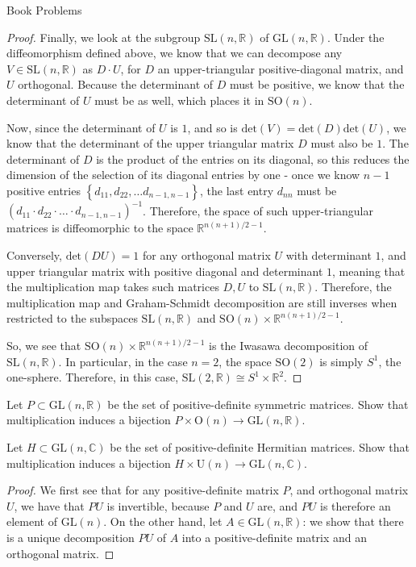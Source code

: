 \documentclass[12pt]{article}
\newcommand{\R}{\mathbb{R}}
\newcommand{\C}{\mathbb{C}}
\theoremstyle{definition}
\newenvironment{problem}[2][Problem]{\begin{trivlist}
\item[\hskip \labelsep {\bfseries #1}\hskip \labelsep {\bfseries #2.}]}{\end{trivlist}}
\begin{document}
\begin{section}{Book Problems}
\begin{proof}
	\par Finally, we look at the subgroup $\text{SL}(n, \R)$ of $\text{GL}(n, \R)$. Under the diffeomorphism defined above, we know that we can decompose any $V \in \text{SL}(n, \R)$ as $D \cdot U$, for $D$ an upper-triangular positive-diagonal matrix, and $U$ orthogonal. Because the determinant of $D$ must be positive, we know that the determinant of $U$ must be as well, which places it in $\text{SO}(n)$. 
	\par Now, since the determinant of $U$ is $1$, and so is $\text{det}(V) = \text{det}(D)\text{det}(U)$, we know that the determinant of the upper triangular matrix $D$ must also be $1$. The determinant of $D$ is the product of the entries on its diagonal, so this reduces the dimension of the selection of its diagonal entries by one - once we know $n-1$ positive entries $\left\{ d_{11}, d_{22}, \dots d_{n-1, n-1} \right\}$, the last entry $d_{nn}$ must be $(d_{11} \cdot d_{22} \cdot \dots \cdot d_{n-1, n-1})^{-1}$. Therefore, the space of such upper-triangular matrices is diffeomorphic to the space $\R^{n(n+1)/2 - 1}$.
	\par Conversely, $\text{det}(DU) = 1$ for any orthogonal matrix $U$ with determinant $1$, and upper triangular matrix with positive diagonal and determinant $1$, meaning that the multiplication map takes such matrices $D, U$ to $\text{SL}(n,\R)$. Therefore, the multiplication map and Graham-Schmidt decomposition are still inverses when restricted to the subspaces $\text{SL}(n, \R)$ and $\text{SO}(n) \times \R^{n(n+1)/2 - 1}$. 
	\par 	So, we see that $\text{SO}(n) \times \R^{n(n+1)/2 - 1}$ is the Iwasawa decomposition of $\text{SL}(n, \R)$. In particular, in the case $n = 2$, the space $\text{SO}(2)$ is simply $S^1$, the one-sphere. Therefore, in this case, $\text{SL}(2, \R) \cong S^1 \times \R^2$.
\end{proof}
\begin{problem}{3}
	Let $P \subset \text{GL}(n, \R)$ be the set of positive-definite symmetric matrices. Show that multiplication induces a bijection $P \times \text{O}(n) \to \text{GL}(n, \R)$.
	\par Let $H \subset \text{GL}(n, \C)$ be the set of positive-definite Hermitian matrices. Show that multiplication induces a bijection $H \times \text{U}(n) \to \text{GL}(n, \C)$.
\end{problem}
\begin{proof}
	We first see that for any positive-definite matrix $P$, and orthogonal matrix $U$, we have that $PU$ is invertible, because $P$ and $U$ are, and $PU$ is therefore an element of $\text{GL}(n)$. On the other hand, let $A \in \text{GL}(n, \R)$: we show that there is a unique decomposition $PU$ of $A$ into a positive-definite matrix and an orthogonal matrix.

\end{proof}
\end{section}
\end{document}
